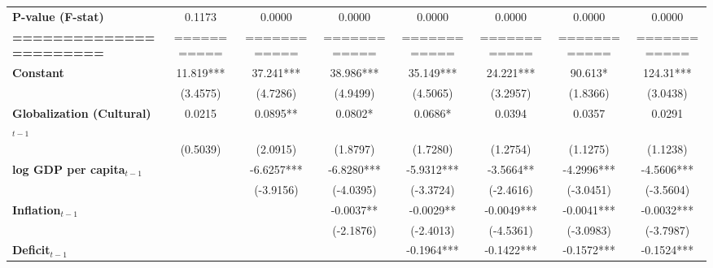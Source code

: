 \begin{center}
\begin{tabular}{lccccccc}
\textbf{P-value (F-stat)}          &       0.1173      &        0.0000        &           0.0000          &       0.0000       &      0.0000     &           0.0000          &            0.0000             \\
\textbf{=======================}   &    ===========    &     ============     &        ============       &    ============    &   ============  &        ============       &         ============          \\
\textbf{Constant}                     &     11.819***     &      37.241***       &         38.986***         &     35.149***      &    24.221***    &          90.613*          &          124.31***            \\
\textbf{ }                         &      (3.4575)     &       (4.7286)       &          (4.9499)         &      (4.5065)      &     (3.2957)    &          (1.8366)         &           (3.0438)            \\
\textbf{Globalization (Cultural)$_{t-1}$}             &       0.0215      &       0.0895**       &          0.0802*          &      0.0686*       &      0.0394     &           0.0357          &            0.0291             \\
\textbf{ }                         &      (0.5039)     &       (2.0915)       &          (1.8797)         &      (1.7280)      &     (1.2754)    &          (1.1275)         &           (1.1238)            \\
\textbf{log GDP per capita$_{t-1}$}           &                   &      -6.6257***      &         -6.8280***        &     -5.9312***     &    -3.5664**    &         -4.2996***        &          -4.5606***           \\
\textbf{ }                         &                   &      (-3.9156)       &         (-4.0395)         &     (-3.3724)      &    (-2.4616)    &         (-3.0451)         &          (-3.5604)            \\
\textbf{Inflation$_{t-1}$}      &                   &                      &         -0.0037**         &     -0.0029**      &    -0.0049***   &         -0.0041***        &          -0.0032***           \\
\textbf{ }                         &                   &                      &         (-2.1876)         &     (-2.4013)      &    (-4.5361)    &         (-3.0983)         &          (-3.7987)            \\
\textbf{Deficit$_{t-1}$}             &                   &                      &                           &     -0.1964***     &    -0.1422***   &         -0.1572***        &          -0.1524***           \\

\end{tabular}
\end{center}
